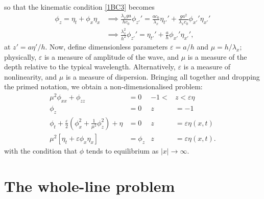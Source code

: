 \documentclass[10pt,reqno,oneside,a4paper]{article}
\begin{document}
so that the kinematic condition \eqref{1BC3} becomes
\begin{align*}
\phi_z = \eta_t + \phi_x\eta_x &\implies \frac{\lambda_x ga}{h c_0} \phi_{z'}'=\frac{ac_0}{\lambda_x}\eta_{t'}' + \frac{ga^2}{\lambda_xc_0} \phi_{x'}' \eta_{x'}' \\
&\implies \frac{\lambda_x^2}{h^2} \phi_{z'}'= \eta_{t'}' + \frac{a}{h} \phi_{x'}' \eta_{x'}',
\end{align*}
at $z' = a\eta'/h.$ Now, define dimensionless parameters $\varepsilon = a/h$ and $\mu = h/\lambda_x;$ physically, $\varepsilon$ is a measure of amplitude of the wave, and $\mu$ is a measure of the depth relative to the typical wavelength. Alternatively, $\varepsilon$ is a measure of nonlinearity, and $\mu$ is a measure of dispersion. Bringing all together and dropping the primed notation, we obtain a non-dimensionalised problem:
\begin{subequations}\label{WLP1DND1}
\begin{align}
\label{1PDEND1}  \mu^2 \phi_{xx} + \phi_{zz} &= 0 &-1 <&z < \varepsilon\eta \\
\label{1BC1ND1} \phi_z &= 0 &z &= -1  \\ 
\label{1BC2ND1} \phi_{t} + \frac{\varepsilon}{2} \left(\phi_{x}^2 + \frac{1}{\mu^2}\phi_{z}^2\right) + \eta &= 0 &z &= \varepsilon\eta(x,t)\\
\label{1BC3ND1} \mu^2 \left[\eta_{t} + \varepsilon \phi_{x} \eta_{x}\right] &= \phi_{z} &z &= \varepsilon\eta(x,t).
\end{align}
\end{subequations}
with the condition that $\phi$ tends to equilibrium as $|x|\to \infty.$

\section{The whole-line problem}
\end{document}
